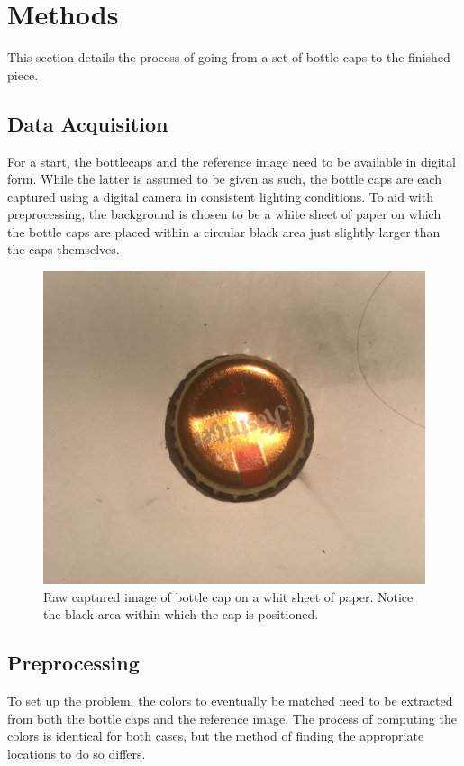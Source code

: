 \documentclass{article}
\begin{document}
\section{Methods}
This section details the process of going from a set of bottle caps to the finished piece.
\subsection{Data Acquisition}
For a start, the bottlecaps and the reference image need to be available in digital form. While the latter is assumed to be given as such, the bottle caps are each captured using a digital camera in consistent lighting conditions. To aid with preprocessing, the background is chosen to be a white sheet of paper on which the bottle caps are placed within a circular black area just slightly larger than the caps themselves.  
\begin{figure}[h]
	\begin{center}
	\includegraphics[width=0.5\linewidth]{cap_raw.png}
	\caption{Raw captured image of bottle cap on a whit sheet of paper. Notice the black area within which the cap is positioned.}
	\label{cap:raw}
\end{center}
\end{figure}
\subsection{Preprocessing}
To set up the problem, the colors to eventually be matched need to be extracted from both the bottle caps and the reference image. The process of computing the colors is identical for both cases, but the method of finding the appropriate locations to do so differs.
\end{document}
